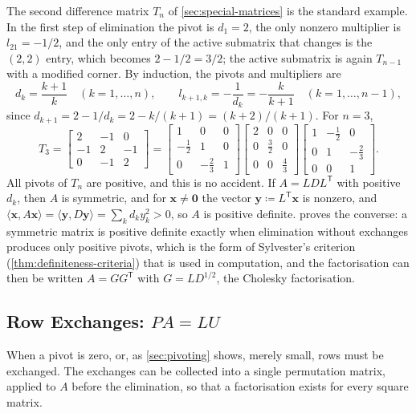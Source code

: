 The second difference matrix $T_n$ of \cref{sec:special-matrices} is the standard example. In the first step of elimination the pivot is $d_1=2$, the only nonzero multiplier is $l_{21}=-1/2$, and the only entry of the active submatrix that changes is the $(2,2)$ entry, which becomes $2-1/2=3/2$; the active submatrix is again $T_{n-1}$ with a modified corner. By induction, the pivots and multipliers are
\[
d_k=\frac{k+1}k\quad(k=1,\ldots,n),\qquad l_{k+1,k}=-\frac1{d_k}=-\frac k{k+1}\quad(k=1,\ldots,n-1),
\]
since $d_{k+1}=2-1/d_k=2-k/(k+1)=(k+2)/(k+1)$. For $n=3$,
\[
T_3=\begin{bmatrix}2&-1&0\\-1&2&-1\\0&-1&2\end{bmatrix}=\begin{bmatrix}1&0&0\\-\frac12&1&0\\0&-\frac23&1\end{bmatrix}\begin{bmatrix}2&0&0\\0&\frac32&0\\0&0&\frac43\end{bmatrix}\begin{bmatrix}1&-\frac12&0\\0&1&-\frac23\\0&0&1\end{bmatrix}.
\]
All pivots of $T_n$ are positive, and this is no accident. If $A=LDL^{\mathsf T}$ with positive $d_k$, then $A$ is symmetric, and for $\mathbf x\ne\mathbf 0$ the vector $\mathbf y\coloneqq L^{\mathsf T}\mathbf x$ is nonzero, and $\langle\mathbf x,A\mathbf x\rangle=\langle\mathbf y,D\mathbf y\rangle=\sum_kd_ky_k^2>0$, so $A$ is positive definite.  proves the converse: a symmetric matrix is positive definite exactly when elimination without exchanges produces only positive pivots, which is the form of Sylvester's criterion (\cref{thm:definiteness-criteria}) that is used in computation, and the factorisation can then be written $A=GG^{\mathsf T}$ with $G=LD^{1/2}$, the Cholesky factorisation.

\subsection{Row Exchanges: \texorpdfstring{$PA=LU$}{PA = LU}}

When a pivot is zero, or, as \cref{sec:pivoting} shows, merely small, rows must be exchanged. The exchanges can be collected into a single permutation matrix, applied to $A$ before the elimination, so that a factorisation exists for every square matrix.

